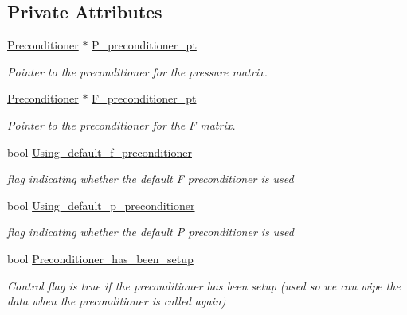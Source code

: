 \subsection*{Private Attributes}
\begin{DoxyCompactItemize}
\item 
\hyperlink{classoomph_1_1Preconditioner}{Preconditioner} $\ast$ \hyperlink{classoomph_1_1NavierStokesSchurComplementPreconditioner_a94c09c485f93eb273f4217460da02811}{P\+\_\+preconditioner\+\_\+pt}
\begin{DoxyCompactList}\small\item\em Pointer to the \textquotesingle{}preconditioner\textquotesingle{} for the pressure matrix. \end{DoxyCompactList}\item 
\hyperlink{classoomph_1_1Preconditioner}{Preconditioner} $\ast$ \hyperlink{classoomph_1_1NavierStokesSchurComplementPreconditioner_a14a63179117e8cf5822c89ae2b5c9902}{F\+\_\+preconditioner\+\_\+pt}
\begin{DoxyCompactList}\small\item\em Pointer to the \textquotesingle{}preconditioner\textquotesingle{} for the F matrix. \end{DoxyCompactList}\item 
bool \hyperlink{classoomph_1_1NavierStokesSchurComplementPreconditioner_a925aa01327e8a6af8c543d2983e92d2f}{Using\+\_\+default\+\_\+f\+\_\+preconditioner}
\begin{DoxyCompactList}\small\item\em flag indicating whether the default F preconditioner is used \end{DoxyCompactList}\item 
bool \hyperlink{classoomph_1_1NavierStokesSchurComplementPreconditioner_a6d9eb3bdee67fafd228e0923e61bd812}{Using\+\_\+default\+\_\+p\+\_\+preconditioner}
\begin{DoxyCompactList}\small\item\em flag indicating whether the default P preconditioner is used \end{DoxyCompactList}\item 
bool \hyperlink{classoomph_1_1NavierStokesSchurComplementPreconditioner_a3584d8bd088fad5ccce394899e167ca3}{Preconditioner\+\_\+has\+\_\+been\+\_\+setup}
\begin{DoxyCompactList}\small\item\em Control flag is true if the preconditioner has been setup (used so we can wipe the data when the preconditioner is called again) \end{DoxyCompactList}\item 

\end{DoxyCompactItemize}
